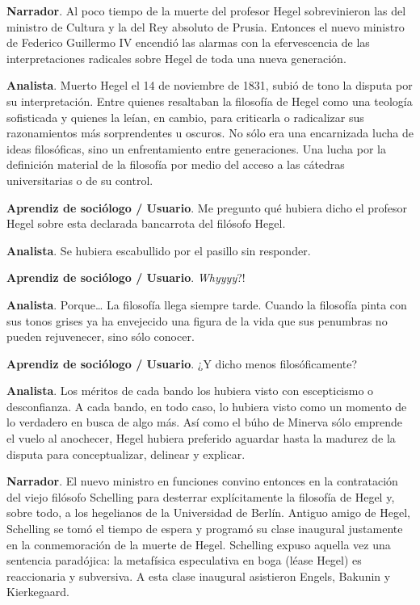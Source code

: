 \documentclass[
]{interact}
\begin{document}
\textbf{Narrador}. Al poco tiempo de la muerte del profesor Hegel
sobrevinieron las del ministro de Cultura y la del Rey absoluto de
Prusia. Entonces el nuevo ministro de Federico Guillermo IV encendió las
alarmas con la efervescencia de las interpretaciones radicales sobre
Hegel de toda una nueva generación.

\textbf{Analista}. Muerto Hegel el 14 de noviembre de 1831, subió de
tono la disputa por su interpretación. Entre quienes resaltaban la
filosofía de Hegel como una teología sofisticada y quienes la leían, en
cambio, para criticarla o radicalizar sus razonamientos más
sorprendentes u oscuros. No sólo era una encarnizada lucha de ideas
filosóficas, sino un enfrentamiento entre generaciones. Una lucha por la
definición material de la filosofía por medio del acceso a las cátedras
universitarias o de su control.

\textbf{Aprendiz de sociólogo / Usuario}. Me pregunto qué hubiera dicho
el profesor Hegel sobre esta declarada bancarrota del filósofo Hegel.

\textbf{Analista}. Se hubiera escabullido por el pasillo sin responder.

\textbf{Aprendiz de sociólogo / Usuario}. \emph{Whyyyy}?!

\textbf{Analista}. Porque\ldots{} La filosofía llega siempre tarde.
Cuando la filosofía pinta con sus tonos grises ya ha envejecido una
figura de la vida que sus penumbras no pueden rejuvenecer, sino sólo
conocer.

\textbf{Aprendiz de sociólogo / Usuario}. ¿Y dicho menos
filosóficamente?

\textbf{Analista}. Los méritos de cada bando los hubiera visto con
escepticismo o desconfianza. A cada bando, en todo caso, lo hubiera
visto como un momento de lo verdadero en busca de algo más. Así como el
búho de Minerva sólo emprende el vuelo al anochecer, Hegel hubiera
preferido aguardar hasta la madurez de la disputa para conceptualizar,
delinear y explicar.

\textbf{Narrador}. El nuevo ministro en funciones convino entonces en la
contratación del viejo filósofo Schelling para desterrar explícitamente
la filosofía de Hegel y, sobre todo, a los hegelianos de la Universidad
de Berlín. Antiguo amigo de Hegel, Schelling se tomó el tiempo de espera
y programó su clase inaugural justamente en la conmemoración de la
muerte de Hegel. Schelling expuso aquella vez una sentencia paradójica:
la metafísica especulativa en boga (léase Hegel) es reaccionaria y
subversiva. A esta clase inaugural asistieron Engels, Bakunin y
Kierkegaard.
\end{document}
